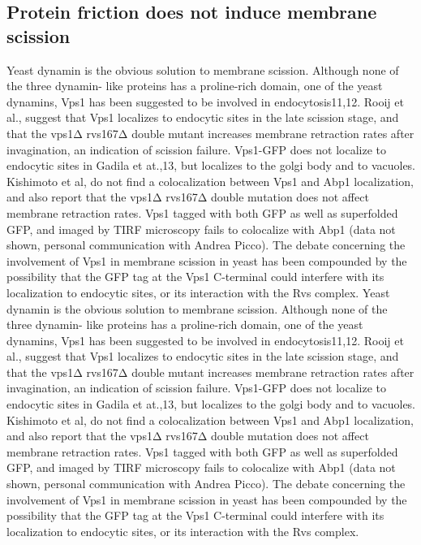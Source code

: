 	\subsection{Protein friction does not induce membrane scission }
		Yeast dynamin is the obvious solution to membrane scission. Although none of the three dynamin- like proteins has a proline-rich domain, one of the yeast dynamins, Vps1 has been suggested to be involved in endocytosis11,12. Rooij et al., suggest that Vps1 localizes to endocytic sites in the late scission stage, and that the vps1Δ rvs167Δ double mutant increases membrane retraction rates after invagination, an indication of scission failure. Vps1-GFP does not localize to endocytic sites in Gadila et at.,13, but localizes to the golgi body and to vacuoles. Kishimoto et al, do not find a colocalization between Vps1 and Abp1 localization, and also report that the vps1Δ rvs167Δ  double mutation does not affect membrane retraction rates. Vps1 tagged with both GFP as well as superfolded GFP, and imaged by TIRF microscopy fails to colocalize with Abp1 (data not shown, personal communication with Andrea Picco). The debate concerning the involvement of Vps1 in membrane scission in yeast has been compounded by the possibility that the GFP tag at the Vps1 C-terminal could interfere with its localization to endocytic sites, or its interaction with the Rvs complex. 
			Yeast dynamin is the obvious solution to membrane scission. Although none of the three dynamin- like proteins has a proline-rich domain, one of the yeast dynamins, Vps1 has been suggested to be involved in endocytosis11,12. Rooij et al., suggest that Vps1 localizes to endocytic sites in the late scission stage, and that the vps1Δ rvs167Δ double mutant increases membrane retraction rates after invagination, an indication of scission failure. Vps1-GFP does not localize to endocytic sites in Gadila et at.,13, but localizes to the golgi body and to vacuoles. Kishimoto et al, do not find a colocalization between Vps1 and Abp1 localization, and also report that the vps1Δ rvs167Δ  double mutation does not affect membrane retraction rates. Vps1 tagged with both GFP as well as superfolded GFP, and imaged by TIRF microscopy fails to colocalize with Abp1 (data not shown, personal communication with Andrea Picco). The debate concerning the involvement of Vps1 in membrane scission in yeast has been compounded by the possibility that the GFP tag at the Vps1 C-terminal could interfere with its localization to endocytic sites, or its interaction with the Rvs complex. 
	
